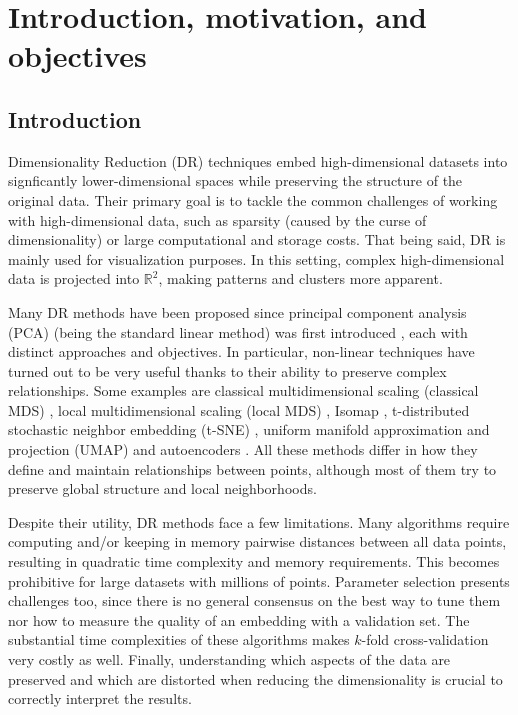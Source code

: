 \section{Introduction, motivation, and objectives}

\subsection{Introduction}

Dimensionality Reduction (DR) techniques embed high-dimensional datasets into signficantly lower-dimensional spaces while preserving the structure of the original data. Their primary goal is to tackle the common challenges of working with high-dimensional data, such as sparsity (caused by the curse of dimensionality) or large computational and storage costs. That being said, DR is mainly used for visualization purposes. In this setting, complex high-dimensional data is projected into $\mathbb{R}^2$, making patterns and clusters more apparent.

Many DR methods have been proposed since principal component analysis (PCA) (being the standard linear method) was first introduced \citep{Pearson1901}, each with distinct approaches and objectives. In particular, non-linear techniques have turned out to be very useful thanks to their ability to preserve complex relationships. Some examples are classical multidimensional scaling (classical MDS) \citep{Torgerson1952, Gower1966}, local multidimensional scaling (local MDS) \citep{Chen2009}, Isomap \citep{Tenenbaum2000}, t-distributed stochastic neighbor embedding (t-SNE) \citep{Vandermaaten2008}, uniform manifold approximation and projection (UMAP) \citep{McInnes2018a} and autoencoders \citep{Baldi1989, Kramer1991}. All these methods differ in how they define and maintain relationships between points, although most of them try to preserve global structure and local neighborhoods.

Despite their utility, DR methods face a few limitations. Many algorithms require computing and/or keeping in memory pairwise distances between all data points, resulting in quadratic time complexity and memory requirements. This becomes prohibitive for large datasets with millions of points. Parameter selection presents challenges too, since there is no general consensus on the best way to tune them nor how to measure the quality of an embedding with a validation set. The substantial time complexities of these algorithms makes $k$-fold cross-validation very costly as well. Finally, understanding which aspects of the data are preserved and which are distorted when reducing the dimensionality is crucial to correctly interpret the results.

